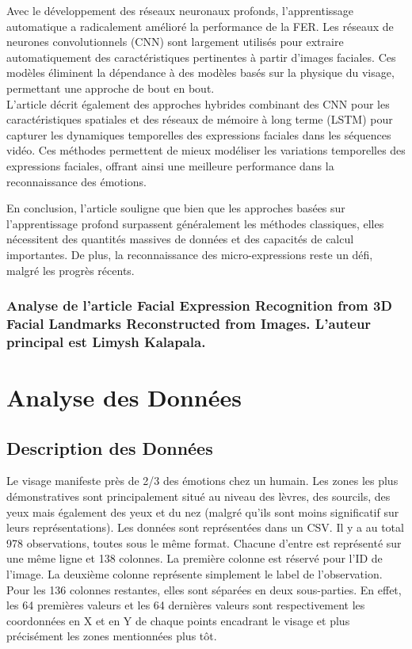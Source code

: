 \documentclass{rapport}
\begin{document}
Avec le développement des réseaux neuronaux profonds, l'apprentissage automatique 
a radicalement amélioré la performance de la FER. Les réseaux de neurones convolutionnels 
(CNN) sont largement utilisés pour extraire automatiquement des caractéristiques pertinentes 
à partir d'images faciales. Ces modèles éliminent la dépendance à des modèles 
basés sur la physique du visage, permettant une approche de bout en bout.
\\L'article décrit également des approches hybrides combinant des CNN pour les 
caractéristiques spatiales et des réseaux de mémoire à long terme (LSTM) pour 
capturer les dynamiques temporelles des expressions faciales dans les séquences vidéo. 
Ces méthodes permettent de mieux modéliser les variations temporelles des expressions 
faciales, offrant ainsi une meilleure performance dans la reconnaissance des émotions.

En conclusion, l'article souligne que bien que les approches basées sur 
l'apprentissage profond surpassent généralement les méthodes classiques, elles 
nécessitent des quantités massives de données et des capacités de calcul 
importantes. De plus, la reconnaissance des micro-expressions reste un défi, 
malgré les progrès récents.

\subsubsection{Analyse de l'article \cite{kalapalaFacialExpressionRecognition2020} Facial Expression Recognition from 3D Facial  Landmarks Reconstructed from Images. L'auteur principal est Limysh Kalapala.}

\section{Analyse des Données}
\subsection{Description des Données}

Le visage manifeste près de 2/3 des émotions chez un humain. \cite{koBriefReviewFacial2018}
Les zones les plus démonstratives sont
principalement situé au niveau des lèvres, des sourcils, des yeux mais
également des yeux et du nez (malgré qu'ils sont moins significatif sur leurs
représentations). \cite{koBriefReviewFacial2018} Les données sont représentées dans
un CSV. Il y a au total 978 observations, toutes sous le même format. Chacune
d'entre est représenté sur une même ligne et 138 colonnes. La première colonne
est réservé pour l'ID de l'image. La deuxième colonne représente simplement le
label de l'observation. Pour les 136 colonnes restantes, elles sont séparées
en deux sous-parties. En effet, les 64 premières valeurs et les 64 dernières
valeurs sont respectivement les coordonnées en X et en Y de chaque points
encadrant le visage et plus précisément les zones mentionnées plus tôt.
\end{document}
